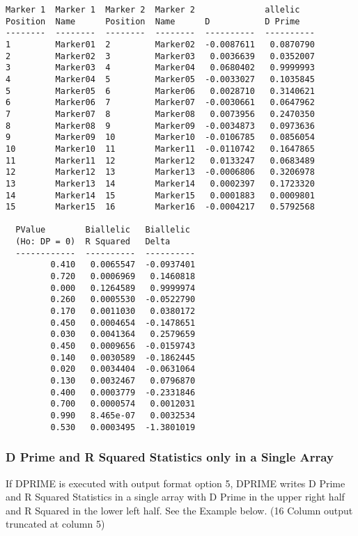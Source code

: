 \begin{verbatim}
Marker 1  Marker 1  Marker 2  Marker 2              allelic   
Position  Name      Position  Name      D           D Prime   
--------  --------  --------  --------  ----------  ----------
1         Marker01  2         Marker02  -0.0087611   0.0870790  
2         Marker02  3         Marker03   0.0036639   0.0352007  
3         Marker03  4         Marker04   0.0680402   0.9999993  
4         Marker04  5         Marker05  -0.0033027   0.1035845  
5         Marker05  6         Marker06   0.0028710   0.3140621  
6         Marker06  7         Marker07  -0.0030661   0.0647962  
7         Marker07  8         Marker08   0.0073956   0.2470350  
8         Marker08  9         Marker09  -0.0034873   0.0973636  
9         Marker09  10        Marker10  -0.0106785   0.0856054  
10        Marker10  11        Marker11  -0.0110742   0.1647865  
11        Marker11  12        Marker12   0.0133247   0.0683489  
12        Marker12  13        Marker13  -0.0006806   0.3206978  
13        Marker13  14        Marker14   0.0002397   0.1723320  
14        Marker14  15        Marker15   0.0001883   0.0009801  
15        Marker15  16        Marker16  -0.0004217   0.5792568

  PValue        Biallelic   Biallelic 
  (Ho: DP = 0)  R Squared   Delta     
  ------------  ----------  ----------
         0.410   0.0065547  -0.0937401
         0.720   0.0006969   0.1460818
         0.000   0.1264589   0.9999974
         0.260   0.0005530  -0.0522790
         0.170   0.0011030   0.0380172
         0.450   0.0004654  -0.1478651
         0.030   0.0041364   0.2579659
         0.450   0.0009656  -0.0159743
         0.140   0.0030589  -0.1862445
         0.020   0.0034404  -0.0631064
         0.130   0.0032467   0.0796870
         0.400   0.0003779  -0.2331846
         0.700   0.0000574   0.0012031
         0.990   8.465e-07   0.0032534
         0.530   0.0003495  -1.3801019
\end{verbatim}

\subsubsection{D Prime and R Squared Statistics only in a Single Array}

If DPRIME is executed with output format option 5, DPRIME writes D Prime and R
Squared Statistics in a single array with D Prime in the upper right half and R
Squared in the lower left half.  See the Example below. (16 Column output
truncated at column 5)

